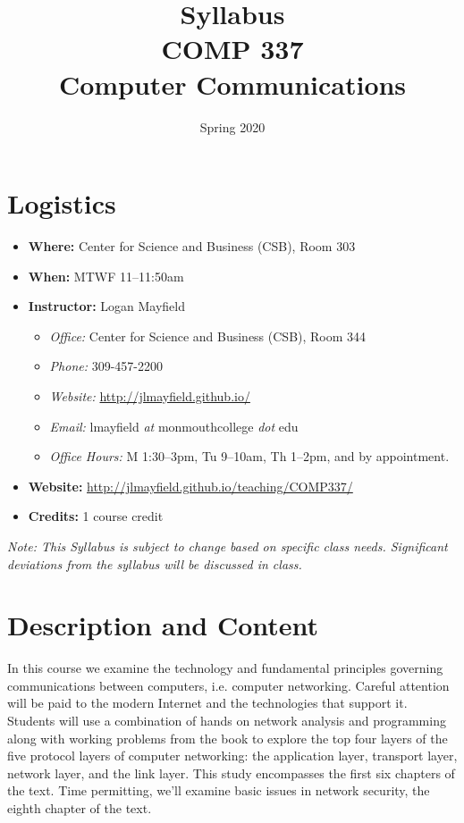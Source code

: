 \documentclass[10pt]{article}
\title{Syllabus \\ COMP 337 \\ Computer Communications}
\author{  }
\date{Spring 2020}
\begin{document}
\maketitle

\section{Logistics}
\begin{itemize}
\item \textbf{Where: }Center for Science and Business (CSB), Room 303
\item \textbf{When: } MTWF 11--11:50am
\item \textbf{Instructor: } Logan Mayfield
\begin{itemize}
\item \textit{Office: } Center for Science and Business (CSB), Room 344
\item \textit{Phone: } 309-457-2200 %
\item \textit{Website: } \url{http://jlmayfield.github.io/}
\item \textit{Email: } lmayfield \textit{at} monmouthcollege \textit{dot} edu
\item \textit{Office Hours: }  M 1:30--3pm, Tu 9--10am, Th 1--2pm, and by appointment.
\end{itemize}
\item \textbf{Website: } \url{http://jlmayfield.github.io/teaching/COMP337/}
\item \textbf{Credits: } 1 course credit
\end{itemize}
\emph{Note: This Syllabus is subject to change based on specific class needs. Significant deviations from the syllabus will be discussed in class.}



\section{Description and Content}

In this course we examine the technology and fundamental principles governing communications between computers, i.e. computer networking. Careful attention will be paid to the modern Internet and the technologies that support it.  Students will use a combination of hands on network analysis and programming along with working problems from the book to explore the top four layers of the five protocol layers of computer networking: the application layer, transport layer, network layer, and the link layer. This study encompasses the first six chapters of the text. Time permitting, we'll examine basic issues in network security, the eighth chapter of the text.
\end{document}
